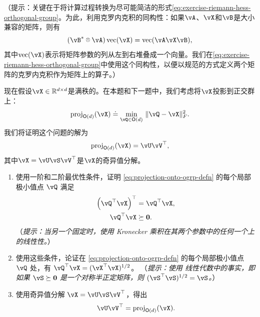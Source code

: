 \documentclass[../../book-main.tex]{subfiles}
\begin{document}
（提示：关键在于将计算过程转换为尽可能简洁的形式\eqref{eq:exercise-riemann-hess-orthogonal-group}。为此，利用克罗内克积的同构性：如果$\vA$、$\vX$和$\vB$是大小兼容的矩阵，则有
        \begin{equation*}
            (\vB\adj \kron \vA) \Vec(\vX) = \Vec(\vA \vX \vB),
        \end{equation*}
        其中$\Vec(\vX)$表示将矩阵参数的列从左到右堆叠成一个向量。我们在\eqref{eq:exercise-riemann-hess-orthogonal-group}中使用这个同构性，以便以规范的方式定义两个矩阵的克罗内克积作为矩阵上的算子。）

        现在假设$\vX \in \R^{d\times d}$是满秩的。在本题和下一题中，我们考虑将$\vX$投影到正交群上：
        \begin{equation}\label{eq:projection-onto-ogrp-defn}
            \mathrm{proj}_{\O(d)}(\vX) \doteq
            \min_{\vQ \in \O(d)
            }\, \norm{\vQ - \vX}_F^2.
        \end{equation}
        我们将证明这个问题的解为
        \begin{equation*}
            \mathrm{proj}_{\O(d)}(\vX)
            =
            \vU \vV^\top,
        \end{equation*}
        其中$\vX = \vU \vS \vV^\top$是$\vX$的奇异值分解。

\begin{enumerate}
            \item 使用一阶和二阶最优性条件，证明 \eqref{eq:projection-onto-ogrp-defn} 的每个局部极小值点 $\vQ$ 满足
            \begin{align*}
                \left( \vQ^\top \vX \right)^\top &= \vQ^\top \vX, \\
                \vQ^\top \vX &\succeq \mathbf{0}.
            \end{align*}
            （\textit{提示：当另一个固定时，使用 Kronecker 乘积在其两个参数中的任何一个上的线性性。}）
            \item 使用这些条件，论证在 \eqref{eq:projection-onto-ogrp-defn} 的每个局部极小值点 $\vQ$ 处，有 $\vQ^\top \vX = (\vX^\top \vX)^{1/2}$。
            （\textit{提示：使用 %
            线性代数中的事实，即如果 $\vS \succeq \mathbf{0}$ 是一个对称半正定矩阵，则 $(\vS^\top\vS)^{1/2} = \vS$。}）
            \item 使用奇异值分解 $\vX = \vU \vS \vV^\top$，得出
            \begin{equation*}
                \vU \vV^\top
                =
                \mathrm{proj}_{\O(d)}(\vX).
            \end{equation*}
        \end{enumerate}
\end{document}
